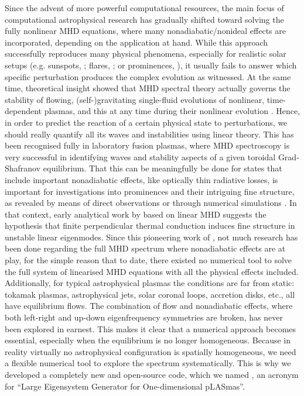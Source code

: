Since the advent of more powerful computational resources, the main focus of computational astrophysical research has gradually shifted toward solving the fully nonlinear MHD equations, where many nonadiabatic/nonideal effects are incorporated, depending on the application at hand. While this approach successfully reproduces many physical phenomena, especially for realistic solar setups (e.g. sunspots, \citet{rempel2012}; flares, \citet{ruan2019}; or prominences, \citet{xia2016}), it usually fails to answer which specific perturbation produces the complex evolution as witnessed. At the same time, theoretical insight showed that MHD spectral theory actually governs the stability of flowing, (self-)gravitating single-fluid evolutions of nonlinear, time-dependent plasmas, and this at any time during their nonlinear evolution \citep{demaerel2016}. Hence, in order to predict the reaction of a certain physical state to perturbations, we should really quantify all its waves and instabilities using linear theory. This has been recognised fully in laboratory fusion plasmas, where MHD spectroscopy is very successful in identifying waves and stability aspects of a given toroidal Grad-Shafranov equilibrium. That this can be meaningfully be done for states that include important nonadiabatic effects, like optically thin radiative losses, is important for investigations into prominences and their intriguing fine structure, as revealed by means of direct observations \citep{engvold1998,ballester2006,mackay2010} or through numerical simulations \citep{xia2016,xia2017,claes2020}. In that context, early analytical work by \citet{vanderlinden1991} based on linear MHD suggests the hypothesis that finite perpendicular thermal conduction induces fine structure in unstable linear eigenmodes. Since this pioneering work of \citet{vanderlinden1991}, not much research has been done regarding the full MHD spectrum where nonadiabatic effects are at play, for the simple reason that to date, there existed no numerical tool to solve the full system of linearised MHD equations with all the physical effects included. Additionally, for typical astrophysical plasmas the conditions are far from static: tokamak plasmas, astrophysical jets, solar coronal loops, accretion disks, etc., all have equilibrium flows. The combination of flow and nonadiabatic effects, where both left-right and up-down eigenfrequency symmetries are broken, has never been explored in earnest. This makes it clear that a numerical approach becomes essential, especially when the equilibrium is no longer homogeneous. Because in reality virtually no astrophysical configuration is spatially homogeneous, we need a flexible numerical tool to explore the spectrum systematically. This is why we developed a completely new and open-source code, which we named {\legolas}, an acronym for ``Large Eigensystem Generator for One-dimensional pLASmas''.

